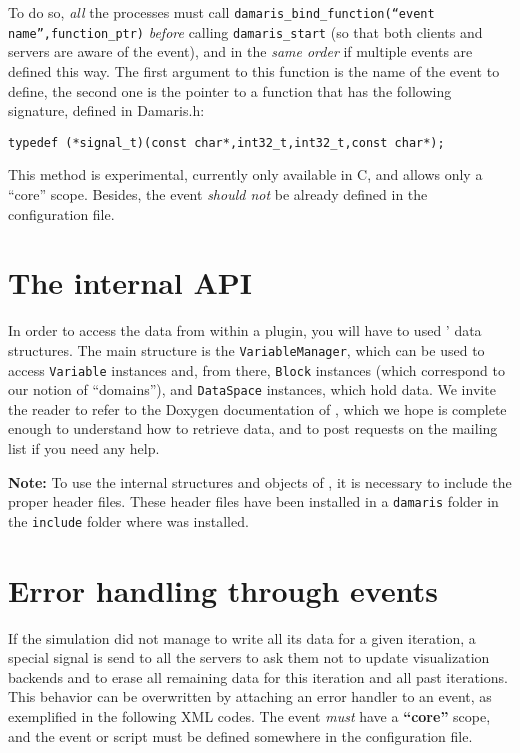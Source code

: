 To do so, \emph{all} the processes must call \texttt{damaris\_bind\_function(``event name'',function\_ptr)} \emph{before}
calling \texttt{damaris\_start} (so that both clients and servers are aware of the event), 
and in the \emph{same order} if multiple events are defined this way. 
The first argument to this function is the name of the event to define,
the second one is the pointer to a function that has the following signature, defined in Damaris.h:
\begin{verbatim}
typedef (*signal_t)(const char*,int32_t,int32_t,const char*);	
\end{verbatim}

This method is experimental, currently only available in C, and allows only a ``core'' scope. 
Besides, the event \emph{should not} be already defined in the configuration file.

\section{The internal \Damaris{} API}\label{sec:internalAPI}

In order to access the data from within a plugin, you will have to used \Damaris' data structures.
The main structure is the \texttt{VariableManager}, which can be used to access \texttt{Variable} instances
and, from there, \texttt{Block} instances (which correspond to our notion of ``domains''), and \texttt{DataSpace}
instances, which hold data.
We invite the reader to refer to the Doxygen documentation of
\Damaris, which we hope is complete enough to understand how to retrieve data,
and to post requests on the \Damaris{} mailing list if you need any help.

\vspace{0.5cm}

\noindent\textbf{Note:} To use the internal structures and objects of \Damaris, it is necessary
to include the proper header files. These header files have been installed in a \texttt{damaris} folder
in the \texttt{include} folder where \Damaris{} was installed.

\section{Error handling through events}

If the simulation did not manage to write all its data for a
given iteration, a special signal is send to all the servers to ask them not to update
visualization backends and to erase all remaining data for this iteration and all past iterations.
This behavior can be overwritten by attaching an error handler to an event,
as exemplified in the following XML codes. The event \emph{must} have a \textbf{``core''} scope,
and the event or script must be defined somewhere in the configuration file.

\noindent\begin{minipage}{\textwidth}
\vspace{0.5cm}

\end{minipage}
